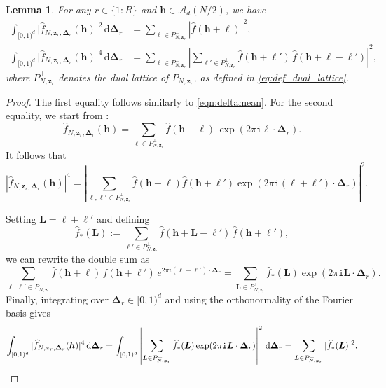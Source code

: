 \documentclass[a4paper,11pt]{article}
\newtheorem{lemma}[theorem]{Lemma}
\newcommand{\rd}{\, \mathrm{d}}
\newcommand{\bsh}{\boldsymbol{h}}
\newcommand{\bsl}{\boldsymbol{\ell}}
\newcommand{\bsL}{\boldsymbol{L}}
\newcommand{\bsz}{\boldsymbol{z}}
\newcommand{\bsDelta}{\boldsymbol{\Delta}}
\newcommand{\icomp}{\mathtt{i}}
\newcommand{\abs}[1]{\left\vert#1\right\vert}
\begin{document}
\begin{lemma} 
For any $r\in\{1{:}R\}$ and $\bsh\in \mathcal{A}_d(N/2)$, we have
\begin{align}
    \int_{[0,1)^d} \bigl|\widehat{f}_{N,\bsz_r,\bsDelta_r}(\bsh)\bigr|^2 \,\mathrm{d}\bsDelta_r
    &= \sum_{\bsl \in P_{N,\boldsymbol{z}_r}^\perp} |\widehat{f}(\bsh+\bsl)|^2, \label{eqn:1stmoment} \\
    \int_{[0,1)^d} \bigl|\widehat{f}_{N,\bsz_r,\bsDelta_r}(\bsh)\bigr|^4 \,\mathrm{d}\bsDelta_r
    &= \sum_{\bsl \in P_{N,\boldsymbol{z}_r}^\perp} \left| \sum_{\bsl' \in P_{N,\boldsymbol{z}_r}^\perp} \widehat{f}(\bsh+\bsl') \, \widehat{f}(\bsh+\bsl-\bsl') \right|^2, \label{eqn:2ndmoment}
\end{align}
where $P_{N,\boldsymbol{z}_r}^\perp$ denotes the dual lattice of $P_{N,\boldsymbol{z}_r}$, as defined in \eqref{eq:def_dual_lattice}.
\end{lemma}

\begin{proof}
The first equality follows similarly to \eqref{eqn:deltamean}. 
For the second equality, we start from \cite[Proof of Lemma 4.1]{CGK24}:
\[
\widehat{f}_{N,\bsz_r,\bsDelta_r}(\bsh) = \sum_{\bsl \in P_{N,\boldsymbol{z}_r}^\perp} \widehat{f}(\bsh+\bsl)\, \exp(2\pi\icomp \bsl\cdot\bsDelta_r).
\]
It follows that
\[ 
    |\widehat{f}_{N,\bsz_r,\bsDelta_r}(\bsh)|^4=\abs{\sum_{\bsl,\bsl' \in P_{N,\boldsymbol{z}_r}^\perp}\widehat{f}(\bsh+\bsl) \widehat{f}(\bsh+\bsl')\exp(2\pi\icomp (\bsl+\bsl')\cdot\bsDelta_r)}^2.
\]

Setting $\bsL = \bsl + \bsl'$ and defining
\[
\widehat{f}_*(\bsL) := \sum_{\bsl' \in P_{N,\boldsymbol{z}_r}^\perp} \widehat{f}(\bsh+\bsL-\bsl')\, \widehat{f}(\bsh+\bsl'),
\]
we can rewrite the double sum as
\[
\sum_{\bsl,\bsl' \in P_{N,\boldsymbol{z}_r}^\perp}
\widehat{f}(\bsh+\bsl)\, \widehat{f}(\bsh+\bsl')\, e^{2\pi i (\bsl+\bsl')\cdot \bsDelta_r} 
= \sum_{\bsL \in P_{N,\boldsymbol{z}_r}^\perp}\widehat{f}_*(\bsL)\exp(2\pi\icomp \bsL\cdot\bsDelta_r).
\]
Finally, integrating over $\bsDelta_r \in [0,1)^d$ and using the orthonormality of the Fourier basis gives
\[
      \int_{[0,1)^d} |\widehat{f}_{N,\bsz_r,\bsDelta_r}(\bsh)|^4\rd\bsDelta_r
      =\int_{[0,1)^d} \abs{\sum_{\bsL \in P_{N,\boldsymbol{z}_r}^\perp}\widehat{f}_*(\bsL)\exp(2\pi\icomp \bsL\cdot\bsDelta_r)}^2\rd\bsDelta_r
      = \sum_{\bsL \in P_{N,\boldsymbol{z}_r}^\perp} |\widehat{f}_*(\bsL)|^2. \qedhere
\]
\end{proof}
\end{document}
